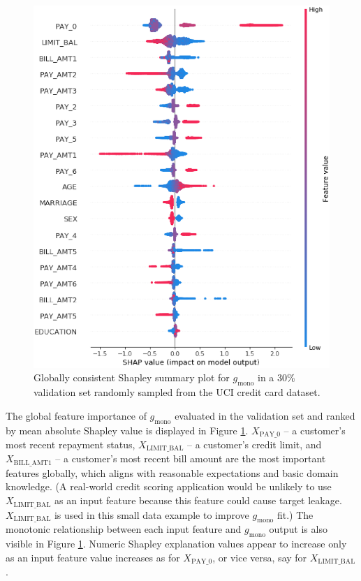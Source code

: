 \documentclass[sigconf, review]{acmart}
\begin{document}
\begin{figure}[htb]
	\begin{center}
		\includegraphics[scale=0.4]{img/figure_7.eps}
		\caption{Globally consistent Shapley summary plot for $g_{\text{mono}}$ in a 30\% validation set randomly sampled from the UCI credit card dataset.}
		\label{fig:cc_global_shapley}
	\end{center}
\end{figure}

The global feature importance of $g_{\text{mono}}$ evaluated in the validation set and ranked by mean absolute Shapley value is displayed in Figure \ref{fig:cc_global_shapley}. $X_{\text{PAY\_0}}$ -- a customer's most recent repayment status, $X_{\text{LIMIT\_BAL}}$ -- a customer's credit limit, and $X_{\text{BILL\_AMT1}}$ -- a customer's most recent bill amount are the most important features globally, which aligns with reasonable expectations and basic domain knowledge. (A real-world credit scoring application would be unlikely to use $X_{\text{LIMIT\_BAL}}$ as an input feature because this feature could cause target leakage. $X_{\text{LIMIT\_BAL}}$ is used in this small data example to improve $g_{\text{mono}}$ fit.) The monotonic relationship between each input feature and $g_{\text{mono}}$ output is also visible in Figure \ref{fig:cc_global_shapley}. Numeric Shapley explanation values appear to increase only as an input feature value increases as for $X_{\text{PAY\_0}}$, or vice versa, say for $X_{\text{LIMIT\_BAL}}$. 
\end{document}
